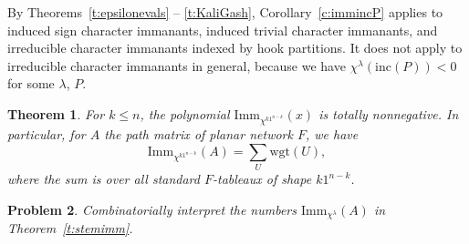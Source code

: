 \documentclass[12pt]{amsart}
\newtheorem{thm}{Theorem}[section]
\newtheorem{cor}[thm]{Corollary}
\newtheorem{prob}[thm]{Problem}
\numberwithin{equation}{section}
\newcommand{\imm}[1]{\mathrm{Imm}_{#1}}
\newcommand{\wgt}{\mathrm{wgt}}
\newcommand{\nTksp}{\negthickspace\negthickspace}
\newcommand{\bp}{\begin{prob}}
\newcommand{\ep}{\end{prob}}
\newcommand{\inc}{\mathrm{inc}}
\newcommand{\mcp}{\mathcal{P}}
\begin{document}
By Theorems~\ref{t:epsilonevals} -- \ref{t:KaliGash},
Corollary~\ref{c:immincP} applies to
induced sign character immanants,
induced trivial character immanants,
and irreducible character immanants indexed by hook partitions.
It does not apply to
irreducible character immanants in general, because we have
$\chi^\lambda(\inc(P)) < 0$ for some $\lambda$, $P$.
\begin{thm}\label{t:hookimm}
  For $k \leq n$,
  the polynomial $\imm{\chi^{k1^{n-k}}}(x)$ is totally nonnegative.
    In particular, for $A$ the path matrix of planar network $F$, we have
    \begin{equation*}
      \imm{\chi^{k1^{n-k}}}(A) = \sum_U \wgt(U),
    \end{equation*}
    where the sum is over all standard $F$-tableaux of shape $k1^{n-k}$.
\end{thm}
\bp\label{p:stemimm}
Combinatorially interpret the numbers $\imm{\chi^\lambda}(A)$ in
Theorem~\ref{t:stemimm}.
\ep

\end{document}
